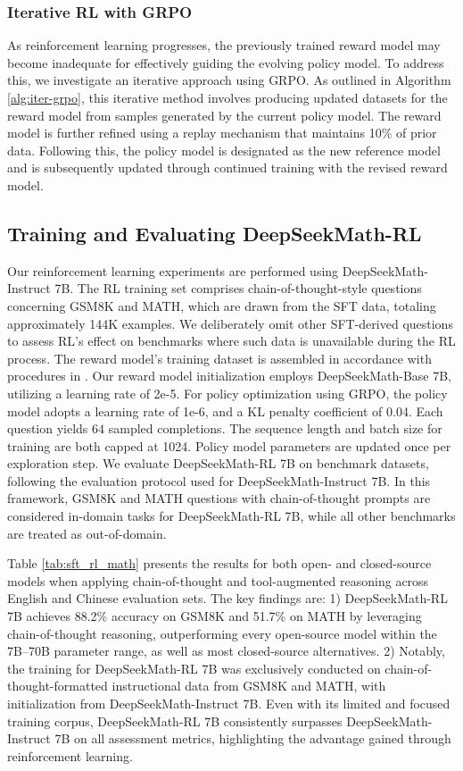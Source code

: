 \begin{itemize}[topsep=0pt]
\begin{itemize}[topsep=0pt]
\subsubsection{Iterative RL with GRPO} As reinforcement learning progresses, the previously trained reward model may become inadequate for effectively guiding the evolving policy model. To address this, we investigate an iterative approach using GRPO. As outlined in Algorithm \ref{alg:iter-grpo}, this iterative method involves producing updated datasets for the reward model from samples generated by the current policy model. The reward model is further refined using a replay mechanism that maintains 10\% of prior data. Following this, the policy model is designated as the new reference model and is subsequently updated through continued training with the revised reward model.

\subsection{Training and Evaluating DeepSeekMath-RL}

Our reinforcement learning experiments are performed using DeepSeekMath-Instruct 7B. The RL training set comprises chain-of-thought-style questions concerning GSM8K and MATH, which are drawn from the SFT data, totaling approximately 144K examples. We deliberately omit other SFT-derived questions to assess RL’s effect on benchmarks where such data is unavailable during the RL process. The reward model’s training dataset is assembled in accordance with procedures in \citep{wang2023math}. Our reward model initialization employs DeepSeekMath-Base 7B, utilizing a learning rate of 2e-5. For policy optimization using GRPO, the policy model adopts a learning rate of 1e-6, and a KL penalty coefficient of 0.04. Each question yields $64$ sampled completions. The sequence length and batch size for training are both capped at 1024. Policy model parameters are updated once per exploration step. We evaluate DeepSeekMath-RL 7B on benchmark datasets, following the evaluation protocol used for DeepSeekMath-Instruct 7B. In this framework, GSM8K and MATH questions with chain-of-thought prompts are considered in-domain tasks for DeepSeekMath-RL 7B, while all other benchmarks are treated as out-of-domain.

Table \ref{tab:sft_rl_math} presents the results for both open- and closed-source models when applying chain-of-thought and tool-augmented reasoning across English and Chinese evaluation sets. The key findings are: 1) DeepSeekMath-RL 7B achieves 88.2\% accuracy on GSM8K and 51.7\% on MATH by leveraging chain-of-thought reasoning, outperforming every open-source model within the 7B–70B parameter range, as well as most closed-source alternatives. 2) Notably, the training for DeepSeekMath-RL 7B was exclusively conducted on chain-of-thought-formatted instructional data from GSM8K and MATH, with initialization from DeepSeekMath-Instruct 7B. Even with its limited and focused training corpus, DeepSeekMath-RL 7B consistently surpasses DeepSeekMath-Instruct 7B on all assessment metrics, highlighting the advantage gained through reinforcement learning.


\end{itemize}
\end{itemize}
